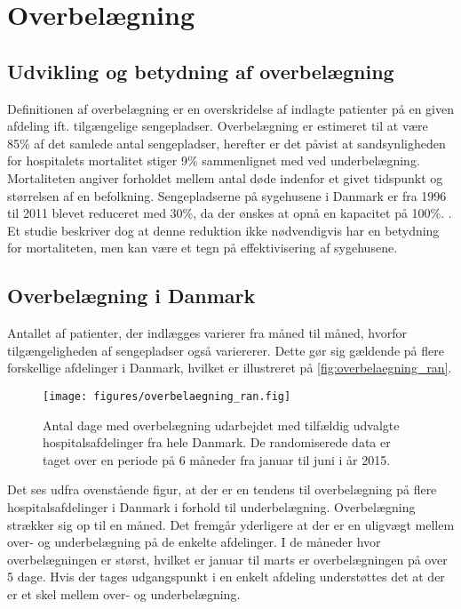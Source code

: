 \section{Overbelægning}

\subsection{Udvikling og betydning af overbelægning}
Definitionen af overbelægning er en overskridelse af indlagte patienter på en given afdeling ift. tilgængelige sengepladser. \citep{denstoredanskeordbog1}  Overbelægning er estimeret til at være 85\% af det samlede antal sengepladser, herefter er det påvist at sandsynligheden for hospitalets mortalitet stiger 9\% sammenlignet med ved underbelægning. \citep{Madsen2014} Mortaliteten angiver forholdet mellem antal døde indenfor et givet tidspunkt og størrelsen af en befolkning. \citep{denstoredanskeordbog2}  Sengepladserne på sygehusene i Danmark er fra 1996 til 2011 blevet reduceret med 30\%, da der ønskes at opnå en kapacitet på 100\%. 
\citep{Madsen2014}. Et studie beskriver dog at denne reduktion ikke nødvendigvis har en betydning for mortaliteten, men kan være et tegn på effektivisering af sygehusene. \citep{Madsen2014}



\subsection{Overbelægning i Danmark}
Antallet af patienter, der indlægges varierer fra måned til måned, hvorfor tilgængeligheden af sengepladser også variererer. Dette gør sig gældende på flere forskellige afdelinger i Danmark, hvilket er illustreret på \autoref{fig:overbelaegning_ran}.
                   
\begin{figure}[H]
\centering
\texttt{[image: figures/overbelaegning\_ran.fig]}
\caption{Antal dage med overbelægning udarbejdet med tilfældig udvalgte hospitalsafdelinger fra hele Danmark. De randomiserede data er taget over en periode på 6 måneder fra januar til juni i år 2015. \citep{SDS2015}}
\label{fig:overbelaegning_ran}
\end{figure}

\noindent
Det ses udfra ovenstående figur, at der er en tendens til overbelægning på flere hospitalsafdelinger i Danmark i forhold til underbelægning. Overbelægning strækker sig op til en måned. Det fremgår yderligere at der er en uligvægt mellem over- og underbelægning på de enkelte afdelinger. I de måneder hvor overbelægningen er størst, hvilket er januar til marts er overbelægningen på over 5 dage. Hvis der tages udgangspunkt i en enkelt afdeling understøttes det at der er et skel mellem over- og underbelægning.\citep{SDS2015}      

